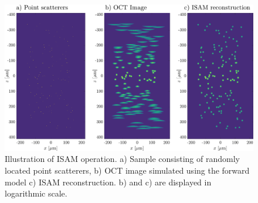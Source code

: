 \begin{figure}[htb!]
    \centering
    \includegraphics[width=\textwidth]{Figures/TheoreticalBasis/IM1.pdf}
    \caption{Illustration of ISAM operation. a) Sample consisting of randomly located point scatterers, b) OCT image simulated using the forward model c) ISAM reconstruction. b) and c) are displayed in logarithmic scale.}
    \label{fig:IM1}
\end{figure}

